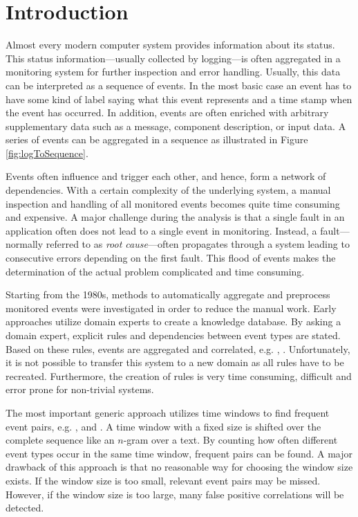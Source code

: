 \documentclass[conference]{IEEEtran}
\theoremstyle{examplestyle}
\begin{document}
\section{Introduction}
Almost every modern computer system provides information about its status. This status information---usually collected by logging---is often aggregated in a monitoring system for further inspection and error handling. Usually, this data can be interpreted as a sequence of events. In the most basic case an event has to have some kind of label saying what this event represents and a time stamp when the event has occurred. In addition, events are often enriched with arbitrary supplementary data such as a message, component description, or input data. A series of events can be aggregated in a sequence as illustrated in Figure \ref{fig:logToSequence}.

Events often influence and trigger each other, and hence, form a network of dependencies. With a certain complexity of the underlying system, a manual inspection and handling of all monitored events becomes quite time consuming and expensive. A major challenge during the analysis is that a single fault in an application often does not lead to a single event in monitoring. Instead, a fault---normally referred to as \textit{root cause}---often propagates through a system leading to consecutive errors depending on the first fault. This flood of events makes the determination of the actual problem complicated and time consuming.


Starting from the 1980s, methods to automatically aggregate and preprocess monitored events were investigated in order to reduce the manual work. Early approaches utilize domain experts to create a knowledge database. By asking a domain expert, explicit rules and dependencies between event types are stated. Based on these rules, events are aggregated and correlated, e.g. \cite{Houck1995}, \cite{Kettschau2002}. Unfortunately, it is not possible to transfer this system to a new domain as all rules have to be recreated. Furthermore, the creation of rules is very time consuming, difficult and error prone for non-trivial systems.

The most important generic approach utilizes time windows to find frequent event pairs, e.g. \cite{Jakobson1993}, \cite{Mannila1997} and \cite{Bouandas2007}. A time window with a fixed size is shifted over the complete sequence like an \(n\)-gram over a text. By counting how often different event types occur in the same time window, frequent pairs can be found. A major drawback of this approach is that no reasonable way for choosing the window size exists. If the window size is too small, relevant event pairs may be missed. However, if the window size is too large, many false positive correlations will be detected.
\end{document}
